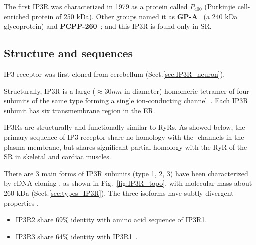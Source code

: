 The first IP3R was characterized in 1979 as a protein called {\bf
$P_{400}$}\citep{mikoshiba1979bai} (Purkinjie cell-enriched protein of 250 kDa).
Other groups named it as {\bf GP-A}~\citep{groswald1984ece} (a 240 kDa
glycoprotein) and {\bf PCPP-260}~\citep{walaas1986pcpp}; and this IP3R is found
only in SR.


\subsection{Structure and sequences}
\label{sec:IP3R-structure}

IP3-receptor was first cloned from cerebellum \citep{furuichi1989}
(Sect.\ref{sec:IP3R_neuron}).

Structurally, IP3R is a large ($\approx 30nm$ in diameter) homomeric tetramer of
four subunits of the same type forming a single ion-conducting
channel~\citep{taylor2004ip3, bezprozvanny2005ip3r}.
Each IP3R subunit has six transmembrane region in the ER.

IP3Rs are structurally and functionally similar to RyRs.
As showed below, the primary sequence of IP3-receptor share no homology with the
-channels in the plasma membrane, but shares significant partial
homology with the RyR of the SR in skeletal and cardiac muscles.

There are 3 main forms of IP3R subunits (type 1, 2, 3) have been characterized
by cDNA cloning \citep{patel1999}, as shown in Fig.~\ref{fig:IP3R_topo}, with
molecular mass about 260 kDa (Sect.\ref{sec:types_IP3R}). The three isoforms
have subtly divergent properties \citep{miyakawa1999}.
\begin{itemize}
  \item  IP3R2 share 69\% identity with amino acid sequence of IP3R1. 
  
  \item IP3R3 share 64\% identity with IP3R1~\citep{rosemblit1999icr}. 
  
\end{itemize}






